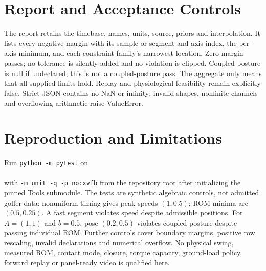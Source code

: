 \documentclass{article}
\begin{document}
\section{Report and Acceptance Controls}
The report retains the timebase, names, units, source, priors and interpolation.
It lists every negative margin with its sample or segment and axis index,
the per-axis minimum, and each constraint family's narrowest location.
Zero margin passes; no tolerance is silently added and no violation is clipped.
Coupled posture is null if undeclared; this is not a coupled-posture pass.
The aggregate only means that all supplied limits hold. Replay and physiological
feasibility remain explicitly false. Strict JSON contains no NaN or infinity;
invalid shapes, nonfinite channels and overflowing arithmetic raise ValueError.
\section{Reproduction and Limitations}
Run \texttt{python -m pytest} on\\
\\
with \texttt{-m unit -q -p no:xvfb} from the repository root after initializing
the pinned Tools submodule. The tests are synthetic algebraic controls,
not admitted golfer data: nonuniform timing gives peak speeds $(1,0.5)$;
ROM minima are $(0.5,0.25)$. A fast segment violates speed despite admissible
positions. For $A=(1,1)$ and $b=0.5$, pose $(0.2,0.5)$ violates coupled
posture despite passing individual ROM. Further controls cover boundary
margins, positive row rescaling, invalid declarations and numerical overflow.
No physical swing, measured ROM, contact mode, closure, torque capacity,
ground-load policy, forward replay or panel-ready video is qualified here.
\end{document}
